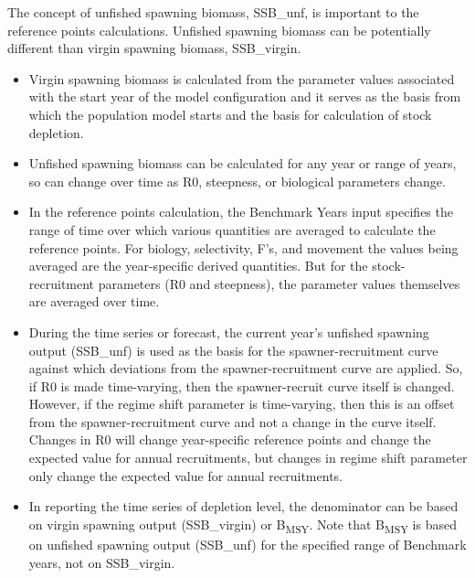 The concept of unfished spawning biomass, SSB\_unf, is important to the reference points calculations.  Unfished spawning biomass can be potentially different than virgin spawning biomass, SSB\_virgin.  
\begin{itemize}
	\item Virgin spawning biomass is calculated from the parameter values associated with the start year of the model configuration and it serves as the basis from which the population model starts and the basis for calculation of stock depletion.
	\item Unfished spawning biomass can be calculated for any year or range of years, so can change over time as R0, steepness, or biological parameters change.
	\item In the reference points calculation, the Benchmark Years input specifies the range of time over which various quantities are averaged to calculate the reference points.  For biology, selectivity, F's, and movement the values being averaged are the year-specific derived quantities.  But for the stock-recruitment parameters (R0 and steepness), the parameter values themselves are averaged over time.
	\item During the time series or forecast, the current year's unfished spawning output (SSB\_unf) is used as the basis for the spawner-recruitment curve against which deviations from the spawner-recruitment curve are applied.  So, if R0 is made time-varying, then the spawner-recruit curve itself is changed.  However, if the regime shift parameter is time-varying, then this is an offset from the spawner-recruitment curve and not a change in the curve itself.  Changes in R0 will change year-specific reference points and change the expected value for annual recruitments, but changes in regime shift parameter only change the expected value for annual recruitments.
	\item In reporting the time series of depletion level, the denominator can be based on virgin spawning output (SSB\_virgin) or B\textsubscript{MSY}.  Note that B\textsubscript{MSY} is based on unfished spawning output (SSB\_unf) for the specified range of Benchmark years, not on SSB\_virgin.
\end{itemize}


\hypertarget{ForeSpawn}{}

